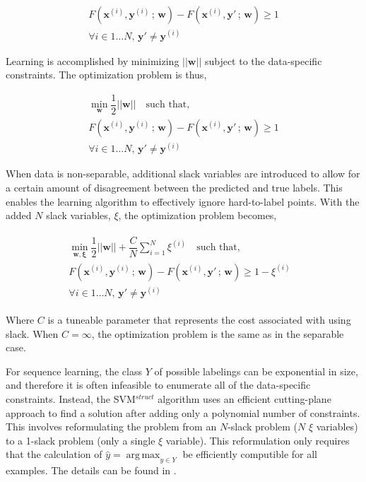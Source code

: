 \documentclass{article}
\DeclareMathOperator*{\argmax}{arg\,max}
\begin{document}
\begin{equation*}
\begin{split}
F(\mathbf{x}^{(i)}, \mathbf{y}^{(i)}\,;\,\mathbf{w}) -
F(\mathbf{x}^{(i)}, \mathbf{y}'\,;\,\mathbf{w}) \geq 1 \\
\forall i \in 1\dots N,\,\mathbf{y}' \neq \mathbf{y}^{(i)}
\end{split}
\end{equation*}

Learning is accomplished by minimizing $||\mathbf{w}||$ subject to the
data-specific constraints. The optimization problem is thus,

\[
\begin{split}
\min_{\mathbf{w}}\dfrac{1}{2}||\mathbf{w}||\quad\text{such that,} \\
F(\mathbf{x}^{(i)}, \mathbf{y}^{(i)}\,;\,\mathbf{w}) -
F(\mathbf{x}^{(i)}, \mathbf{y}'\,;\,\mathbf{w}) \geq 1 \\
\forall i \in 1\dots N, \,\mathbf{y}' \neq \mathbf{y}^{(i)}
\end{split}
\]

When data is non-separable, additional slack variables are introduced to allow
for a certain amount of disagreement between the predicted and true labels.
  This enables the learning algorithm to effectively ignore hard-to-label
  points. With the added $N$ slack variables, $\xi$, the optimization problem
  becomes,

\begin{align*}
\begin{split}
\min_{\mathbf{w, \xi}}\dfrac{1}{2}||\mathbf{w}|| +
\dfrac{C}{N}\sum_{i=1}^{N}\xi^{(i)}
\quad\text{such that,}&\\
F(\mathbf{x}^{(i)}, \mathbf{y}^{(i)}\,;\,\mathbf{w}) -
F(\mathbf{x}^{(i)}, \mathbf{y}'\,;\,\mathbf{w}) \geq 1 - \xi^{(i)} \\
\forall i \in 1\dots N, \,\mathbf{y}' \neq \mathbf{y}^{(i)}
\end{split}
\end{align*}

Where $C$ is a tuneable parameter that represents the cost associated with
using slack. When $C = \infty$, the optimization problem is the same as in
the separable case.

For sequence learning, the class $Y$ of possible labelings can be exponential
in size, and therefore it is often infeasible to enumerate all of the
data-specific constraints. Instead, the SVM$^{struct}$ algorithm uses an
efficient cutting-plane approach to find a solution after adding only a
polynomial number of constraints. This involves reformulating the problem from
an $N$-slack problem ($N$ $\xi$ variables) to a 1-slack problem (only a single
$\xi$ variable). This reformulation only requires that the calculation of
$\hat{y} = \argmax_{y \in Y}$ be efficiently computible for all examples. The
details can be found in \cite{joachims2009cutting}.
\end{document}
